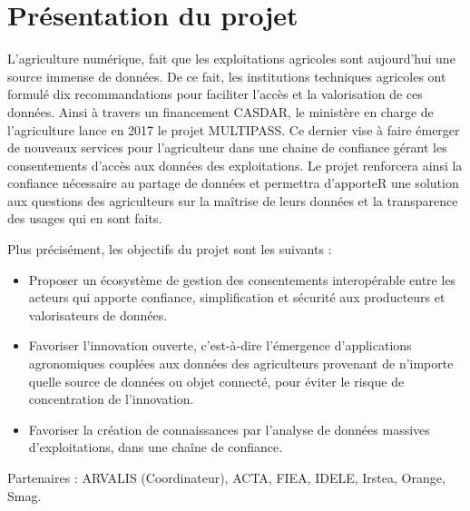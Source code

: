 \section{Présentation du projet} 
L'agriculture numérique, fait que les exploitations agricoles sont aujourd’hui une source immense de données. De ce fait, les institutions techniques agricoles ont formulé dix recommandations pour faciliter l’accès  et la valorisation de ces données. Ainsi à travers un financement CASDAR,  le ministère en charge de l’agriculture lance en 2017 le projet  MULTIPASS. Ce dernier vise à faire émerger de nouveaux services pour l’agriculteur dans une chaine de confiance gérant les consentements d’accès aux données des exploitations. Le projet renforcera ainsi la confiance nécessaire au partage de données et permettra d’apporteR une solution aux questions des agriculteurs sur la maîtrise de leurs données et la transparence des usages qui en sont faits. 

Plus précisément, les objectifs du projet sont les suivants : 

\begin{itemize}
    \item Proposer un écosystème de gestion des consentements interopérable entre les acteurs qui apporte confiance, simplification et sécurité aux producteurs et valorisateurs de données. 
    \item Favoriser l’innovation ouverte, c’est-à-dire l’émergence d’applications agronomiques couplées aux données des agriculteurs provenant de n’importe quelle source de données ou objet connecté, pour éviter le risque de concentration de l’innovation. 
    \item Favoriser la création de connaissances par l’analyse de données massives d’exploitations, dans une chaîne de confiance. 
\end{itemize}

Partenaires : ARVALIS (Coordinateur), ACTA, FIEA, IDELE, Irstea, Orange, Smag.
